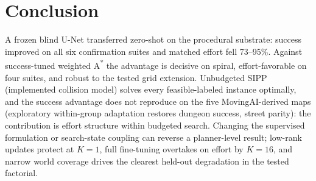 \documentclass[letterpaper]{article} %
\begin{document}
\section{Conclusion}

A frozen blind U-Net transferred zero-shot on the procedural substrate: success improved on all six confirmation suites and matched effort fell 73--95\%. Against success-tuned weighted A\textsuperscript{*} the advantage is decisive on spiral, effort-favorable on four suites, and robust to the tested grid extension. Unbudgeted SIPP (implemented collision model) solves every feasible-labeled instance optimally, and the success advantage does not reproduce on the five MovingAI-derived maps (exploratory within-group adaptation restores dungeon success, street parity): the contribution is effort structure within budgeted search. Changing the supervised formulation or search-state coupling can reverse a planner-level result; low-rank updates protect at $K{=}1$, full fine-tuning overtakes on effort by $K{=}16$, and narrow world coverage drives the clearest held-out degradation in the tested factorial.



\end{document}
